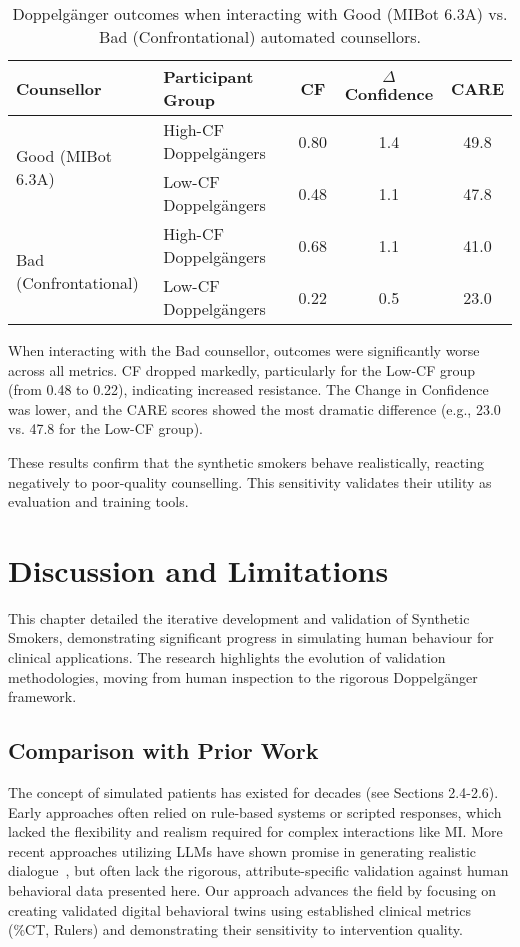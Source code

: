 \begin{table}[h!]
\centering
\caption{Doppelgänger outcomes when interacting with Good (MIBot 6.3A) vs. Bad (Confrontational) automated counsellors.}
\label{tab:good-vs-bad-counselling}
\begin{tabular}{@{}llccc@{}}
\toprule
\textbf{Counsellor} & \textbf{Participant Group} & \textbf{CF} & \textbf{$\Delta$Confidence} & \textbf{CARE} \\ \midrule
\multirow{2}{*}{Good (MIBot 6.3A)} & High-CF Doppelgängers & 0.80 & 1.4 & 49.8 \\
 & Low-CF Doppelgängers & 0.48 & 1.1 & 47.8 \\ \midrule
\multirow{2}{*}{Bad (Confrontational)} & High-CF Doppelgängers & 0.68 & 1.1 & 41.0 \\
 & Low-CF Doppelgängers & 0.22 & 0.5 & 23.0 \\ \bottomrule
\end{tabular}
\end{table}

When interacting with the Bad counsellor, outcomes were significantly worse across all metrics. CF dropped markedly, particularly for the Low-CF group (from 0.48 to 0.22), indicating increased resistance. The Change in Confidence was lower, and the CARE scores showed the most dramatic difference (e.g., 23.0 vs. 47.8 for the Low-CF group).

These results confirm that the synthetic smokers behave realistically, reacting negatively to poor-quality counselling. This sensitivity validates their utility as evaluation and training tools.

\section{Discussion and Limitations}

This chapter detailed the iterative development and validation of Synthetic Smokers, demonstrating significant progress in simulating human behaviour for clinical applications. The research highlights the evolution of validation methodologies, moving from human inspection to the rigorous Doppelgänger framework.

\subsection{Comparison with Prior Work}

The concept of simulated patients has existed for decades (see Sections 2.4-2.6). Early approaches often relied on rule-based systems or scripted responses, which lacked the flexibility and realism required for complex interactions like MI. More recent approaches utilizing LLMs have shown promise in generating realistic dialogue~\citep{cheng2023gpatients}, but often lack the rigorous, attribute-specific validation against human behavioral data presented here. Our approach advances the field by focusing on creating validated digital behavioral twins using established clinical metrics (\%CT, Rulers) and demonstrating their sensitivity to intervention quality.

